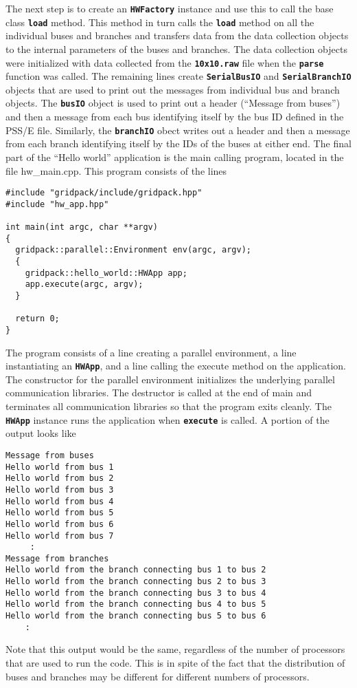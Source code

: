 The next step is to create an \texttt{\textbf{HWFactory}} instance and use this to call the base class \texttt{\textbf{load}} method. This method in turn calls the \texttt{\textbf{load}} method on all the individual buses and branches and transfers data from the data collection objects to the internal parameters of the buses and branches. The data collection objects were initialized with data collected from the \texttt{\textbf{10x10.raw}} file when the \texttt{\textbf{parse}} function was called. The remaining lines create \texttt{\textbf{SerialBusIO}} and \texttt{\textbf{SerialBranchIO}} objects that are used to print out the messages from individual bus and branch objects. The \texttt{\textbf{busIO}} object is used to print out a header (``Message from buses'') and then a message from each bus identifying itself by the bus ID defined in the PSS/E file. Similarly, the \texttt{\textbf{branchIO}} obect writes out a header and then a message from each branch identifying itself by the IDs of the buses at either end.
The final part of the ``Hello world'' application is the main calling program, located in the file hw\_main.cpp. This program consists of the lines

{
\color{red}
\begin{Verbatim}[fontseries=b]
#include "gridpack/include/gridpack.hpp"
#include "hw_app.hpp"

int main(int argc, char **argv)
{
  gridpack::parallel::Environment env(argc, argv);
  {
    gridpack::hello_world::HWApp app;
    app.execute(argc, argv);
  }

  return 0;
}
\end{Verbatim}
}

The program consists of a line creating a parallel environment, a line instantiating an \texttt{\textbf{HWApp}}, and a line calling the execute method on the application. The constructor for the parallel environment initializes the underlying parallel communication libraries. The destructor is called at the end of main and terminates all communication libraries so that the program exits cleanly. The \texttt{\textbf{HWApp}} instance runs the application when \texttt{\textbf{execute}} is called. A portion of the output looks like

{
\color{red}
\begin{Verbatim}[fontseries=b]
Message from buses
Hello world from bus 1
Hello world from bus 2
Hello world from bus 3
Hello world from bus 4
Hello world from bus 5
Hello world from bus 6
Hello world from bus 7
     :
Message from branches
Hello world from the branch connecting bus 1 to bus 2
Hello world from the branch connecting bus 2 to bus 3
Hello world from the branch connecting bus 3 to bus 4
Hello world from the branch connecting bus 4 to bus 5
Hello world from the branch connecting bus 5 to bus 6
    :
\end{Verbatim}
}

Note that this output would be the same, regardless of the number of processors that are used to run the code. This is in spite of the fact that the distribution of buses and branches may be different for different numbers of processors.
